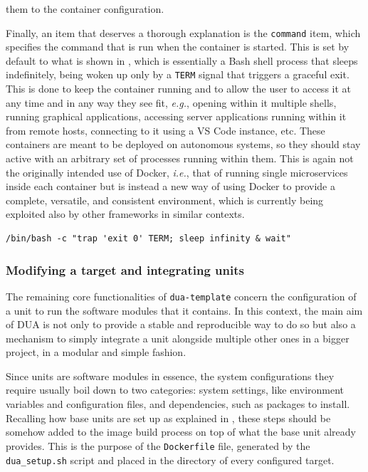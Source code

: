 them to the container configuration.

Finally, an item that deserves a thorough explanation is the \texttt{command} item, which specifies the command that is run when the container is started. This is set by default to what is shown in , which is essentially a Bash shell process that sleeps indefinitely, being woken up only by a \texttt{TERM} signal that triggers a graceful exit. This is done to keep the container running and to allow the user to access it at any time and in any way they see fit, \emph{e.g.}, opening within it multiple shells, running graphical applications, accessing server applications running within it from remote hosts, connecting to it using a VS Code instance, etc. These containers are meant to be deployed on autonomous systems, so they should stay active with an arbitrary set of processes running within them. This is again not the originally intended use of Docker, \emph{i.e.}, that of running single microservices inside each container but is instead a new way of using Docker to provide a complete, versatile, and consistent environment, which is currently being exploited also by other frameworks in similar contexts.
\begin{center}
\begin{minipage}[t]{.9\textwidth}
\begin{lstlisting}[caption=Default command of a DUA container: an idle shell process., label={lst:duacmd}]
/bin/bash -c "trap 'exit 0' TERM; sleep infinity & wait"
\end{lstlisting}
\end{minipage}
\end{center}

\subsubsection{Modifying a target and integrating units}
\label{sec:dua_template_configuration_modify}
The remaining core functionalities of \texttt{dua-template} concern the configuration of a unit to run the software modules that it contains. In this context, the main aim of DUA is not only to provide a stable and reproducible way to do so but also a mechanism to simply integrate a unit alongside multiple other ones in a bigger project, in a modular and simple fashion.

Since units are software modules in essence, the system configurations they require usually boil down to two categories: system settings, like environment variables and configuration files, and dependencies, such as packages to install. Recalling how base units are set up as explained in , these steps should be somehow added to the image build process on top of what the base unit already provides. This is the purpose of the \texttt{Dockerfile} file, generated by the \texttt{dua\_setup.sh} script and placed in the directory of every configured target.

